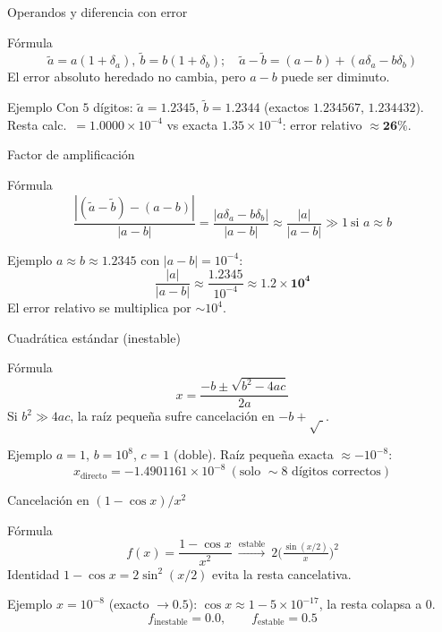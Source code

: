 \documentclass[aspectratio=169,10pt]{beamer}
\begin{document}
\begin{frame}{Operandos y diferencia con error}
\begin{cardidea}{Fórmula}{\faSuperscript}
\[ \tilde a=a(1+\delta_a),\ \tilde b=b(1+\delta_b);\quad \tilde a-\tilde b=(a-b)+(a\delta_a-b\delta_b) \]
El error absoluto heredado no cambia, pero $a-b$ puede ser diminuto.
\end{cardidea}
\vspace{1.5mm}
\begin{cardgear}{Ejemplo}{\faCalculator}
Con $5$ dígitos: $\tilde a=1.2345$, $\tilde b=1.2344$ (exactos $1.234567$, $1.234432$).
Resta calc.\ $=1.0000\times10^{-4}$ vs exacta $1.35\times10^{-4}$: error relativo $\approx\mathbf{26\%}$.
\end{cardgear}
\end{frame}

\begin{frame}{Factor de amplificación}
\begin{cardidea}{Fórmula}{\faSuperscript}
\[ \frac{|(\tilde a-\tilde b)-(a-b)|}{|a-b|}=\frac{|a\delta_a-b\delta_b|}{|a-b|}\approx \frac{|a|}{|a-b|}\gg 1\ \text{si } a\approx b \]
\end{cardidea}
\vspace{1.5mm}
\begin{cardgear}{Ejemplo}{\faCalculator}
$a\approx b\approx 1.2345$ con $|a-b|=10^{-4}$:
\[ \frac{|a|}{|a-b|}\approx \frac{1.2345}{10^{-4}}\approx \mathbf{1.2\times10^{4}} \]
El error relativo se multiplica por $\sim 10^{4}$.
\end{cardgear}
\end{frame}

\begin{frame}{Cuadrática estándar (inestable)}
\begin{cardidea}{Fórmula}{\faSuperscript}
\[ x=\frac{-b\pm\sqrt{b^2-4ac}}{2a} \]
Si $b^2\gg 4ac$, la raíz pequeña sufre cancelación en $-b+\sqrt{\;}$.
\end{cardidea}
\vspace{1.5mm}
\begin{cardgear}{Ejemplo}{\faCalculator}
$a=1$, $b=10^{8}$, $c=1$ (doble). Raíz pequeña exacta $\approx-10^{-8}$:
\[ x_{\text{directo}}=-1.4901161\times10^{-8}\ (\text{solo }\sim 8\text{ dígitos correctos}) \]
\end{cardgear}
\end{frame}

\begin{frame}{Cancelación en $(1-\cos x)/x^2$}
\begin{cardidea}{Fórmula}{\faSuperscript}
\[ f(x)=\frac{1-\cos x}{x^2}\ \xrightarrow{\text{estable}}\ 2\Big(\tfrac{\sin(x/2)}{x}\Big)^2 \]
Identidad $1-\cos x=2\sin^2(x/2)$ evita la resta cancelativa.
\end{cardidea}
\vspace{1.5mm}
\begin{cardgear}{Ejemplo}{\faCalculator}
$x=10^{-8}$ (exacto $\to 0.5$): $\cos x\approx 1-5\times10^{-17}$, la resta colapsa a $0$.
\[ f_{\text{inestable}}=\mathbf{0.0},\qquad f_{\text{estable}}=\mathbf{0.5} \]
\end{cardgear}
\end{frame}
\end{document}
